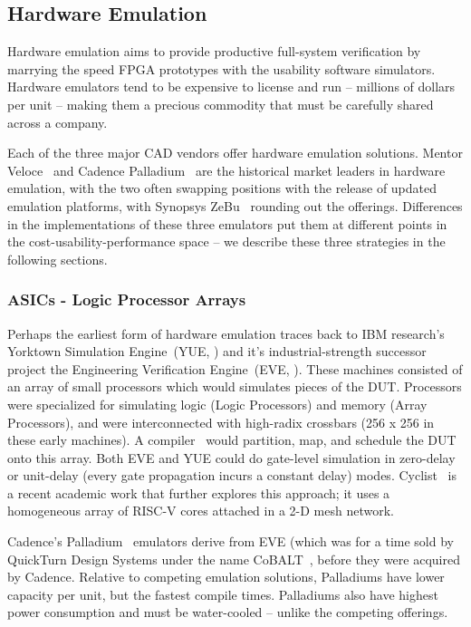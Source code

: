\subsection{Hardware Emulation}

Hardware emulation aims to provide productive full-system verification by
marrying the speed FPGA prototypes with the usability software simulators.
Hardware emulators tend to be expensive to license and run -- millions of
dollars per unit -- making them a precious commodity that must be carefully
shared across a company.

Each of the three major CAD vendors offer hardware emulation solutions.
Mentor Veloce~\cite{Veloce} and Cadence Palladium~\cite{Palladium} are the historical market leaders in
hardware emulation, with the two often swapping positions with the release of updated
emulation platforms, with Synopsys ZeBu~\cite{ZeBu} rounding out the offerings.
Differences in the implementations of these three emulators put them at
different points in the cost-usability-performance space -- we describe these three strategies in the following sections.

\subsubsection{ASICs - Logic Processor Arrays}

Perhaps the earliest form of hardware emulation traces back to IBM research's
Yorktown Simulation Engine~(YUE, \cite{YSEHardware}) and it's industrial-strength successor project
the Engineering Verification Engine~(EVE, \cite{EngineeringVerificationEngine}). These machines consisted of an array
of small processors which would simulates pieces of the DUT. Processors were
specialized for simulating logic (Logic Processors) and memory (Array
Processors), and were interconnected with high-radix crossbars (256 x 256 in
these early machines). A compiler~\cite{YSESoftware} would partition, map, and schedule
the DUT onto this array. Both EVE and YUE could do gate-level simulation in zero-delay
or unit-delay (every gate propagation incurs a constant delay) modes. Cyclist~\cite{Cyclist}
is a recent academic work that further explores this approach; it uses a
homogeneous array of RISC-V cores attached in a 2-D mesh network.

Cadence's Palladium~\cite{Palladium} emulators derive from EVE (which was for a time sold by QuickTurn Design Systems under the name CoBALT~\cite{CoBALT}, before they
were acquired by Cadence. Relative to
competing emulation solutions, Palladiums have lower capacity per unit, but the
fastest compile times. Palladiums also have highest power consumption and must be
water-cooled -- unlike the competing offerings.


